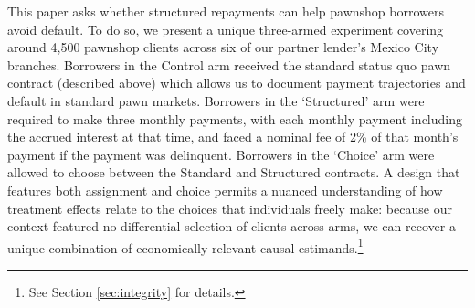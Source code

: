 \documentclass[12pt, a4paper, colorinlistoftodos]{article}
\begin{document}

This paper asks whether structured repayments can help pawnshop borrowers avoid default.  To do so, we present a unique three-armed experiment covering around 4,500 pawnshop clients across six of our partner lender's Mexico City branches.  Borrowers in the Control arm received the standard status quo pawn contract (described above) which allows us to document payment trajectories and default in standard pawn markets.  Borrowers in the `Structured' arm were required to make three monthly payments, with each monthly payment including the accrued interest at that time, and faced a nominal fee of 2\% of that month's payment if the payment was delinquent.  Borrowers in the `Choice' arm were allowed to choose between the Standard and Structured contracts.   A design that features both assignment and choice permits a nuanced understanding of how treatment effects relate to the choices that individuals freely make: because our context featured no differential selection of clients across arms, we can recover a unique combination of economically-relevant causal estimands.\footnote{See Section \ref{sec:integrity} for details.}
\end{document}
